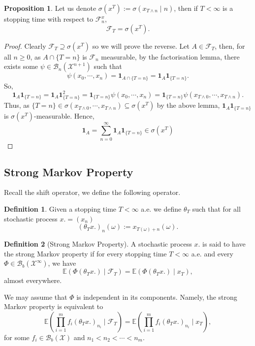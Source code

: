\documentclass[]{article}
\theoremstyle{definition}
\theoremstyle{definition}
\newtheorem{definition}{Definition}[section]
\newtheorem{proposition}{Proposition}[section]
\begin{document}
\begin{proposition}
  Let us denote \(\sigma(x^T) := \sigma(x_{T \wedge n} \mid n)\), then if 
  \(T < \infty\) is a stopping time with respect to \(\mathcal{F}_n^x\), 
  \[\mathcal{F}_T = \sigma(x^T).\] 
\end{proposition}
\begin{proof}
  Clearly \(\mathcal{F}_T \supseteq \sigma(x^T)\) so we will prove the reverse. 
  Let \(A \in \mathcal{F}_T\), then, for all \(n \ge 0\), as \(A \cap \{T = n\}\) 
  is \(\mathcal{F}_n\) measurable, by the factorisation lemma, there exists some 
  \(\psi \in \mathcal{B}_n(\mathcal{X}^{n + 1})\) such that
  \[\psi(x_0, \cdots, x_n) = \mathbf{1}_{A \cap \{T = n\}} = \mathbf{1}_A\mathbf{1}_{\{T = n\}}.\]
  So,
  \[\mathbf{1}_A\mathbf{1}_{\{T = n\}} =  \mathbf{1}_A \mathbf{1}_{\{T = n\}}^2 = 
    \mathbf{1}_{\{T = n\}} \psi(x_0, \cdots, x_n) = 
    \mathbf{1}_{\{T = n\}} \psi(x_{T \wedge 0}, \cdots, x_{T \wedge n}).\]
  Thus, as \(\{T = n\} \in \sigma(x_{T \wedge 0}, \cdots, x_{T \wedge n}) \subseteq \sigma(x^T)\) by the 
  above lemma, \(\mathbf{1}_A \mathbf{1}_{\{T = n\}}\) is \(\sigma(x^T)\)-measurable. Hence,
  \[\mathbf{1}_A = \sum_{n = 0}^\infty \mathbf{1}_A \mathbf{1}_{\{T = n\}} 
    \in \sigma(x^T)\]
\end{proof}

\subsection{Strong Markov Property}

Recall the shift operator, we define the following operator.

\begin{definition}
  Given a stopping time \(T < \infty\) a.e. we define \(\theta_T\) 
  such that for all stochastic process \(x. = (x_n)\) 
  \[(\theta_T x.)_n(\omega) := x_{T(\omega) + n}(\omega).\]
\end{definition}

\begin{definition}[Strong Markov Property]
  A stochastic process \(x.\) is said to have the strong Markov property if 
  for every stopping time \(T < \infty\) a.e. and every 
  \(\Phi \in \mathcal{B}_b(\mathcal{X}^\infty)\), we have 
  \[\mathbb{E}(\Phi(\theta_T x.) \mid \mathcal{F}_T) = \mathbb{E}(\Phi(\theta_T x.) \mid x_T),\]
  almost everywhere.
\end{definition}

We may assume that \(\Phi\) is independent in its components. Namely, the strong Markov 
property is equivalent to 
\[\mathbb{E}\left(\prod_{i = 1}^m f_i(\theta_T x.)_{n_i} \mid \mathcal{F}_T\right) = 
  \mathbb{E}\left(\prod_{i = 1}^m f_i(\theta_T x.)_{n_i} \mid x_T\right),\]
for some \(f_i \in \mathcal{B}_b(\mathcal{X})\) and \(n_1 < n_2 < \cdots < n_m\).
\end{document}
